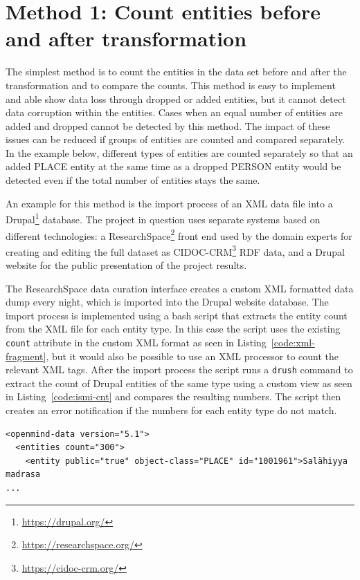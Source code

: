 \documentclass[final]{anthology-ch} %
\begin{document}
\section{Method 1: Count entities before and after transformation}

The simplest method is to count the entities in the data set before and after the transformation and to compare the counts. This method is easy to implement and able show data loss through dropped or added entities, but it cannot detect data corruption within the entities. Cases when an equal number of entities are added and dropped cannot be detected by this method. The impact of these issues can be reduced if groups of entities are counted and compared separately. In the example below, different types of entities are counted separately so that an added PLACE entity at the same time as a dropped PERSON entity would be detected even if the total number of entities stays the same.

An example for this method is the import process of an XML data file into a Drupal\footnote{\url{https://drupal.org/}} database. The project in question uses separate systems based on different technologies: a ResearchSpace\footnote{\url{https://researchspace.org/}} front end used by the domain experts for creating and editing the full dataset as CIDOC-CRM\footnote{\url{https://cidoc-crm.org/}} RDF data, and a Drupal website for the public presentation of the project results.

The ResearchSpace data curation interface creates a custom XML formatted data dump every night, which is imported into the Drupal website database. The import process is implemented using a bash script that extracts the entity count from the XML file for each entity type. In this case the script uses the existing \texttt{count} attribute in the custom XML format as seen in Listing~\ref{code:xml-fragment}, but it would also be possible to use an XML processor to count the relevant XML tags. After the import process the script runs a \texttt{drush} command to extract the count of Drupal entities of the same type using a custom view as seen in Listing~\ref{code:ismi-cnt} and compares the resulting numbers. The script then creates an error notification if the numbers for each entity type do not match.

\begin{listing}
\begin{verbatim}
<openmind-data version="5.1">
  <entities count="300">
    <entity public="true" object-class="PLACE" id="1001961">Salähiyya madrasa
...
\end{verbatim}
\label{code:xml-fragment}
\end{listing}
\end{document}
